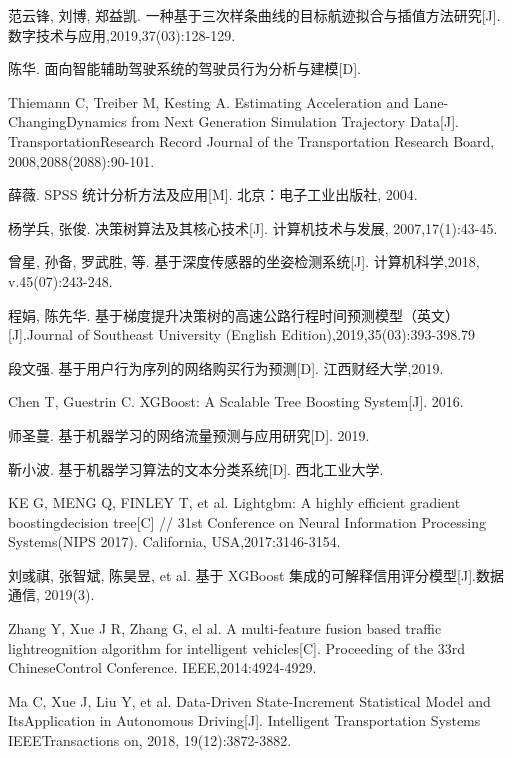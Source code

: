 范云锋, 刘博, 郑益凯. 一种基于三次样条曲线的目标航迹拟合与插值方法研究[J]. 数字技术与应用,2019,37(03):128-129.

陈华. 面向智能辅助驾驶系统的驾驶员行为分析与建模[D].

Thiemann C, Treiber M, Kesting A. Estimating Acceleration and Lane-ChangingDynamics from Next Generation Simulation Trajectory Data[J]. TransportationResearch Record Journal of the Transportation Research Board, 2008,2088(2088):90-101.

薛薇. SPSS 统计分析方法及应用[M]. 北京：电子工业出版社, 2004.

杨学兵, 张俊. 决策树算法及其核心技术[J]. 计算机技术与发展, 2007,17(1):43-45.

曾星, 孙备, 罗武胜, 等. 基于深度传感器的坐姿检测系统[J]. 计算机科学,2018, v.45(07):243-248.

程娟, 陈先华. 基于梯度提升决策树的高速公路行程时间预测模型（英文）[J].Journal of Southeast University (English Edition),2019,35(03):393-398.79

段文强. 基于用户行为序列的网络购买行为预测[D]. 江西财经大学,2019.

Chen T, Guestrin C. XGBoost: A Scalable Tree Boosting System[J]. 2016.

师圣蔓. 基于机器学习的网络流量预测与应用研究[D]. 2019.

靳小波. 基于机器学习算法的文本分类系统[D]. 西北工业大学.

KE G, MENG Q, FINLEY T, et al. Lightgbm: A highly efficient gradient boostingdecision tree[C] // 31st Conference on Neural Information Processing Systems(NIPS 2017). California, USA,2017:3146-3154.

刘彧祺, 张智斌, 陈昊昱, et al. 基于 XGBoost 集成的可解释信用评分模型[J].数据通信, 2019(3).

Zhang Y, Xue J R, Zhang G, el al. A multi-feature fusion based traffic lightreognition algorithm for intelligent vehicles[C]. Proceeding of the 33rd ChineseControl Conference. IEEE,2014:4924-4929.

Ma C, Xue J, Liu Y, et al. Data-Driven State-Increment Statistical Model and ItsApplication in Autonomous Driving[J]. Intelligent Transportation Systems IEEETransactions on, 2018, 19(12):3872-3882.

\newpage
